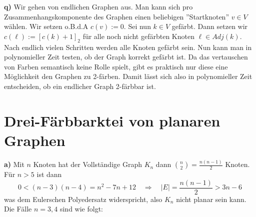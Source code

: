 \documentclass[a4paper,graphics,11pt]{article}
\begin{document}
\newpage

\textbf{q)}
Wir gehen von endlichen Graphen aus.
Man kann sich pro Zusammenhangskomponente des Graphen einen beliebigen ''Startknoten'' $v \in V$ wählen.
Wir setzen o.B.d.A $c(v) := 0$. Sei nun $k \in V$ gefärbt. Dann setzen wir $c(\ell) := [c(k)+1]_2$ für alle noch nicht
gefärbten Knoten $\ell \in Adj(k)$.
Nach endlich vielen Schritten werden alle Knoten gefärbt sein. Nun kann man in polynomieller Zeit testen, ob der Graph
korrekt gefärbt ist.
Da das vertauschen von Farben semantisch keine Rolle spielt, gibt es praktisch nur diese eine Möglichkeit den Graphen zu 2-färben.
Damit lässt sich also in polynomieller Zeit entscheiden, ob ein endlicher Graph 2-färbbar ist.

\newpage

\section{Drei-Färbbarktei von planaren Graphen}


\textbf{a)}
Mit $n$ Knoten hat der Vollständige Graph $K_n$ dann $\binom{n}{2} = \frac{n(n-1)}{2}$ Knoten.
Für $n > 5$ ist dann
$$
    0 < (n-3)(n-4) = n^2-7n+12
    \quad\Longrightarrow\quad |E| = \frac{n(n-1)}{2} > 3n-6
$$
was dem Eulerschen Polyedersatz widerspricht, also $K_n$ nicht planar sein kann.
Die Fälle $n=3,4$ sind wie folgt:\\

\begin{minipage}{.5\textwidth}
\begin{center}
\end{center}
\end{minipage}
\begin{minipage}{.5\textwidth}
\begin{center}
\end{center}
\end{minipage}
\end{document}
